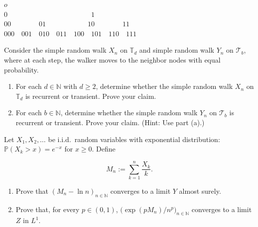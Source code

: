 \documentclass[11pt,a4paper]{article}
\newcommand{\examstatement}[1]{%
  \par\addvspace{0.85em}%
  \noindent{\bfseries #1}\par\nobreak\addvspace{0.28em}%
}
\begin{document}
\begin{center}
\small
\( o \)\\[0.7em]
\( 0 \qquad\qquad\qquad\qquad\qquad\qquad 1 \)\\[0.7em]
\( 00 \qquad\qquad 01 \qquad\qquad\qquad 10 \qquad\qquad 11 \)\\[0.7em]
\( 000 \quad 001 \quad 010 \quad 011 \quad 100 \quad 101 \quad 110 \quad 111 \)
\end{center}

Consider the simple random walk \( X_n \) on \( \mathbb{T}_d \) and simple random walk \( Y_n \) on \( \mathcal{T}_b \), where at each step, the walker moves to the neighbor nodes with equal probability.
\begin{enumerate}[label=(\alph*)]
    \item For each \( d \in \mathbb{N} \) with \( d \ge 2 \), determine whether the simple random walk \( X_n \) on \( \mathbb{T}_d \) is recurrent or transient. Prove your claim.
    \item For each \( b \in \mathbb{N} \), determine whether the simple random walk \( Y_n \) on \( \mathcal{T}_b \) is recurrent or transient. Prove your claim. (Hint: Use part (a).)
\end{enumerate}

\examstatement{Problem 5. [15 pts.]}
Let \( X_1, X_2, \dots \) be i.i.d.\ random variables with exponential distribution: \( \mathbb{P}(X_k > x) = e^{-x} \) for \( x \ge 0 \). Define

\[
M_n := \sum_{k=1}^n \frac{X_k}{k}.
\]

\begin{enumerate}[label=(\alph*)]
    \item Prove that \( (M_n - \ln n)_{n \in \mathbb{N}} \) converges to a limit \( Y \) almost surely.
    \item Prove that, for every \( p \in (0, 1) \), \( \bigl( \exp(p M_n)/n^p \bigr)_{n \in \mathbb{N}} \) converges to a limit \( Z \) in \( L^1 \).
\end{enumerate}
\end{document}
